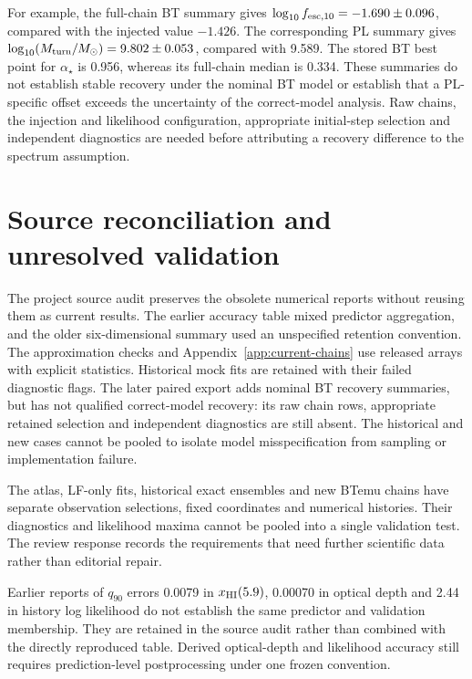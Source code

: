 For example, the full-chain BT summary gives $\log_{10}f_{{\rm esc},10}=-1.690\pm0.096$, compared with the injected value $-1.426$. The corresponding PL summary gives $\log_{10}(M_{\rm turn}/M_\odot)=9.802\pm0.053$, compared with 9.589. The stored BT best point for $\alpha_\star$ is 0.956, whereas its full-chain median is 0.334. These summaries do not establish stable recovery under the nominal BT model or establish that a PL-specific offset exceeds the uncertainty of the correct-model analysis. Raw chains, the injection and likelihood configuration, appropriate initial-step selection and independent diagnostics are needed before attributing a recovery difference to the spectrum assumption.

\section{Source reconciliation and unresolved validation}\label{app:reconciliation}
The project source audit preserves the obsolete numerical reports without reusing them as current results. The earlier accuracy table mixed predictor aggregation, and the older six-dimensional summary used an unspecified retention convention. The approximation checks and Appendix~\ref{app:current-chains} use released arrays with explicit statistics. Historical mock fits are retained with their failed diagnostic flags. The later paired export adds nominal BT recovery summaries, but has not qualified correct-model recovery: its raw chain rows, appropriate retained selection and independent diagnostics are still absent. The historical and new cases cannot be pooled to isolate model misspecification from sampling or implementation failure.

The atlas, LF-only fits, historical exact ensembles and new BTemu chains have separate observation selections, fixed coordinates and numerical histories. Their diagnostics and likelihood maxima cannot be pooled into a single validation test. The review response records the requirements that need further scientific data rather than editorial repair.

Earlier reports of $q_{90}$ errors 0.0079 in $x_{\rm HI}(5.9)$, 0.00070 in optical depth and 2.44 in history log likelihood do not establish the same predictor and validation membership. They are retained in the source audit rather than combined with the directly reproduced table. Derived optical-depth and likelihood accuracy still requires prediction-level postprocessing under one frozen convention.

